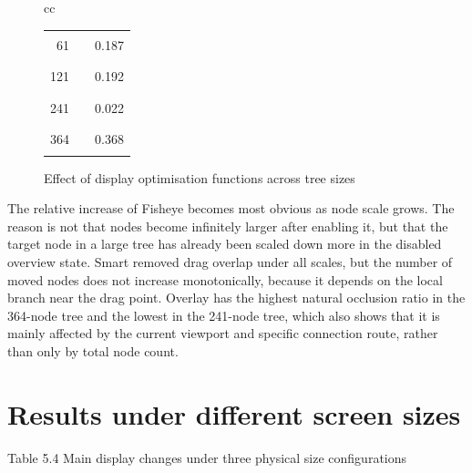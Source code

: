 \documentclass[11pt,a4paper,oneside,extrafontsizes]{memoir}
\begin{document}
\begin{center}
\begin{figure}[htbp]
\begin{tabular}{cc}
\begin{minipage}[t]{0.46\textwidth}
\begin{tabular}{@{}r l r@{}}
61 & \textcolor{blue!70!black}{\rule{0.1017\textwidth}{1.1ex}} & 0.187 \\
121 & \textcolor{blue!70!black}{\rule{0.1043\textwidth}{1.1ex}} & 0.192 \\
241 & \textcolor{blue!70!black}{\rule{0.0180\textwidth}{1.1ex}} & 0.022 \\
364 & \textcolor{blue!70!black}{\rule{0.2000\textwidth}{1.1ex}} & 0.368 \\
\end{tabular}
\end{minipage}
\end{tabular}
\caption{Effect of display optimisation functions across tree sizes}
\label{fig:display-size-metrics}
\end{figure}

\end{center}

The relative increase of Fisheye becomes most obvious as node scale grows. The reason is not that nodes become infinitely larger after enabling it, but that the target node in a large tree has already been scaled down more in the disabled overview state. Smart removed drag overlap under all scales, but the number of moved nodes does not increase monotonically, because it depends on the local branch near the drag point. Overlay has the highest natural occlusion ratio in the 364-node tree and the lowest in the 241-node tree, which also shows that it is mainly affected by the current viewport and specific connection route, rather than only by total node count.

\section{Results under different screen sizes}

Table 5.4 Main display changes under three physical size configurations
\end{document}

